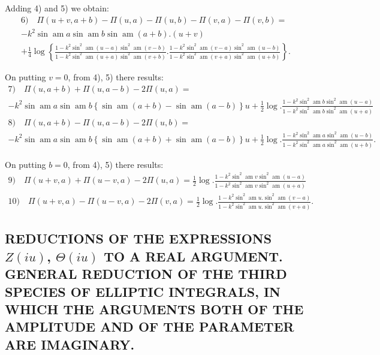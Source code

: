 \documentclass{article}
\begin{document}
Adding 4) and 5) we obtain:
\[
\begin{gathered}
\text{6)}\quad \Pi(u+v,a+b)-\Pi(u,a)-\Pi(u,b)-\Pi(v,a)-\Pi(v,b)=\\[1.5ex]
-k^{2}\sin\operatorname{am}a\sin\operatorname{am}b\sin\operatorname{am}(a+b).(u+v)\\[1.5ex]
+\frac{1}{4}\log\left\{\frac{1-k^{2}\sin^{2}\operatorname{am}(u-a)\sin^{2}\operatorname{am}(v-b)}{1-k^{2}\sin^{2}\operatorname{am}(u+a)\sin^{2}\operatorname{am}(v+b)}.\frac{1-k^{2}\sin^{2}\operatorname{am}(v-a)\sin^{2}\operatorname{am}(u-b)}{1-k^{2}\sin^{2}\operatorname{am}(v+a)\sin^{2}\operatorname{am}(u+b)}\right\}.
\end{gathered}
\]

On putting $v=0$, from 4), 5) there results:
\[
\begin{gathered}
\text{7)}\quad \Pi(u,a+b)+\Pi(u,a-b)-2\Pi(u,a)=\\[1.5ex]
-k^{2}\sin\operatorname{am}a\sin\operatorname{am}b\left\{\sin\operatorname{am}(a+b)-\sin\operatorname{am}(a-b)\right\}u+\frac{1}{2}\log.\frac{1-k^{2}\sin^{2}\operatorname{am}b\sin^{2}\operatorname{am}(u-a)}{1-k^{2}\sin^{2}\operatorname{am}b\sin^{2}\operatorname{am}(u+a)}\\[1.5ex]
\text{8)}\quad \Pi(u,a+b)-\Pi(u,a-b)-2\Pi(u,b)=\\[1.5ex]
-k^{2}\sin\operatorname{am}a\sin\operatorname{am}b\left\{\sin\operatorname{am}(a+b)+\sin\operatorname{am}(a-b)\right\}u+\frac{1}{2}\log.\frac{1-k^{2}\sin^{2}\operatorname{am}a\sin^{2}\operatorname{am}(u-b)}{1-k^{2}\sin^{2}\operatorname{am}a\sin^{2}\operatorname{am}(u+b)}.
\end{gathered}
\]

On putting $b=0$, from 4), 5) there results:
\[
\begin{gathered}
\text{9)}\quad \Pi(u+v,a)+\Pi(u-v,a)-2\Pi(u,a)=\frac{1}{2}\log.\frac{1-k^{2}\sin^{2}\operatorname{am}v\sin^{2}\operatorname{am}(u-a)}{1-k^{2}\sin^{2}\operatorname{am}v\sin^{2}\operatorname{am}(u+a)}\\[1.5ex]
\text{10)}\quad \Pi(u+v,a)-\Pi(u-v,a)-2\Pi(v,a)=\frac{1}{2}\log.\frac{1-k^{2}\sin^{2}\operatorname{am}u.\sin^{2}\operatorname{am}(v-a)}{1-k^{2}\sin^{2}\operatorname{am}u.\sin^{2}\operatorname{am}(v+a)}.
\end{gathered}
\]

\subsection*{REDUCTIONS OF THE EXPRESSIONS $Z(iu)$, $\Theta(iu)$ TO A REAL ARGUMENT. GENERAL REDUCTION OF THE THIRD SPECIES OF ELLIPTIC INTEGRALS, IN WHICH THE ARGUMENTS BOTH OF THE AMPLITUDE AND OF THE PARAMETER ARE IMAGINARY.}
\end{document}
